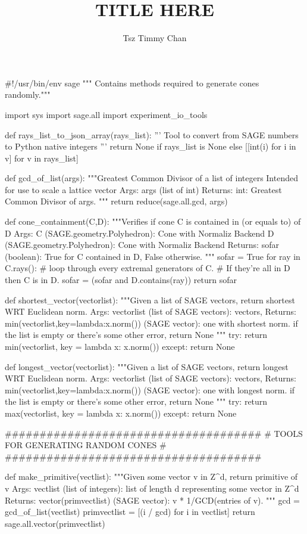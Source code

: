 \documentclass{TC}
\title{TITLE HERE}	%
\author{Tsz Timmy Chan}	%
\begin{document}
\begin{SAGE}
#!/usr/bin/env sage
""" Contains methods required to generate cones randomly."""

import sys
import sage.all
import experiment_io_tools


def rays_list_to_json_array(rays_list):
	''' Tool to convert from SAGE numbers to Python native integers '''
	return None if rays_list is None else [[int(i) for i in v] for v in rays_list] 

def gcd_of_list(args):
	"""Greatest Common Divisor of a list of integers
	Intended for use to scale a lattice vector
	Args:
		args (list of int)
	Returns:
		int: Greatest Common Divisor of args.
	"""
	return reduce(sage.all.gcd, args)


def cone_containment(C,D):
	"""Verifies if cone C is contained in (or equals to) of D
	Args:
		C (SAGE.geometry.Polyhedron): Cone with Normaliz Backend
		D (SAGE.geometry.Polyhedron): Cone with Normaliz Backend
	Returns: 
		sofar (boolean): True for C contained in D, False otherwise.
	"""
	sofar = True
	for ray in C.rays():
		# loop through every extremal generators of C. 
		# If they're all in D then C is in D.
		sofar = (sofar and D.contains(ray))
	return sofar


def shortest_vector(vectorlist):
	"""Given a list of SAGE vectors, return shortest WRT Euclidean norm.
	Args:
		vectorlist (list of SAGE vectors): vectors, 
	Returns:
		min(vectorlist,key=lambda:x.norm()) (SAGE vector): one with shortest norm.
		if the list is empty or there's some other error, return None
	"""
	try:
		return min(vectorlist, key = lambda x: x.norm())
	except:
		return None 


def longest_vector(vectorlist):
	"""Given a list of SAGE vectors, return longest WRT Euclidean norm.
	Args:
		vectorlist (list of SAGE vectors): vectors, 
	Returns:
		min(vectorlist,key=lambda:x.norm()) (SAGE vector): one with longest norm.
		if the list is empty or there's some other error, return None
	"""
	try:
		return max(vectorlist, key = lambda x: x.norm()) 
	except:
		return None

	  
#####################################
# TOOLS FOR GENERATING RANDOM CONES #
#####################################

def make_primitive(vectlist):
	"""Given some vector v in Z^d, return primitive of v
	Args:
		vectlist (list of integers): list of length d representing some vector in Z^d
	Returns:
		vector(primvectlist) (SAGE vector): v * 1/GCD(entries of v). 
	"""
	gcd = gcd_of_list(vectlist)
	primvectlist = [(i / gcd) for i in vectlist] 
	return sage.all.vector(primvectlist)


\end{SAGE}
\end{document}
